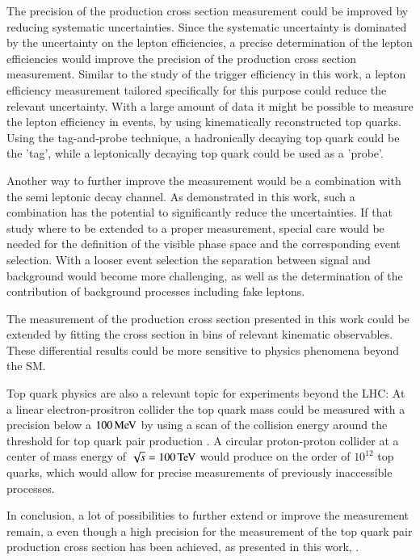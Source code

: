 The precision of the \ttbar production cross section measurement could be improved by reducing systematic uncertainties.
Since the systematic uncertainty is dominated by the uncertainty on the lepton efficiencies, a precise determination of the lepton efficiencies would improve the precision of the \ttbar production cross section measurement.
Similar to the study of the trigger efficiency in this work, a lepton efficiency measurement tailored specifically for this purpose could reduce the relevant uncertainty.
With a large amount of data it might be possible to measure the lepton efficiency in \ttbar events, by using kinematically reconstructed top quarks. Using the tag-and-probe technique, a hadronically 
decaying top quark could be the 'tag', while a leptonically decaying top quark could be used as a 'probe'.

Another way to further improve the measurement would be a combination with the semi leptonic \ttbar decay channel. As demonstrated in this work, such a combination has the potential to significantly reduce the uncertainties.
If that study where to be extended to a proper measurement, special care would be needed for the definition of the visible phase space and the corresponding event selection. With a looser event selection the separation between
signal and background would become more challenging, as well as the determination of the contribution of background processes including fake leptons.

The measurement of the \ttbar production cross section presented in this work could be extended by fitting the cross section in bins of relevant kinematic observables.
These differential results could be more sensitive to physics phenomena beyond the SM.

Top quark physics are also a relevant topic for experiments beyond the LHC: At a linear electron-prositron collider the top quark mass could be measured with a precision below a $100 \,\text{Me\hspace{-.08em}V}$ by using a scan
of the collision energy around the threshold for top quark pair production \cite{Seidel2013}. A circular proton-proton collider at a center of mass energy of $\sqrt{s}=100 \,\text{Te\hspace{-.08em}V}$ would produce on the order
of $10^{12}$ top quarks, which would allow for precise measurements of previously inaccessible processes.

In conclusion, a lot of possibilities to further extend or improve the measurement remain, a even though a high precision for the measurement of the top quark pair production cross section has been achieved, as presented in this work, .

